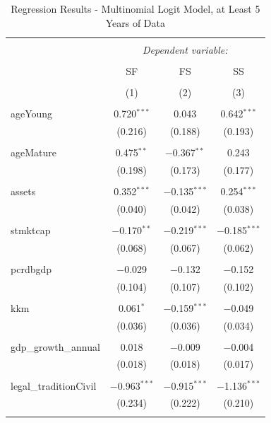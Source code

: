\documentclass[a4paper, nobind]{templates/ociamthesis}
\begin{document}
\begin{table}[!htbp] \centering 
  \caption{Regression Results - Multinomial Logit Model, at Least 5 Years of Data} 
  \label{} 
\footnotesize 
\begin{tabular}{@{\extracolsep{5pt}}lccc} 
\\[-1.8ex]\hline 
\hline \\[-1.8ex] 
 & \multicolumn{3}{c}{\textit{Dependent variable:}} \\ 
\cline{2-4} 
\\[-1.8ex] & SF & FS & SS \\ 
\\[-1.8ex] & (1) & (2) & (3)\\ 
\hline \\[-1.8ex] 
 ageYoung & 0.720$^{***}$ & 0.043 & 0.642$^{***}$ \\ 
  & (0.216) & (0.188) & (0.193) \\ 
  & & & \\ 
 ageMature & 0.475$^{**}$ & $-$0.367$^{**}$ & 0.243 \\ 
  & (0.198) & (0.173) & (0.177) \\ 
  & & & \\ 
 assets & 0.352$^{***}$ & $-$0.135$^{***}$ & 0.254$^{***}$ \\ 
  & (0.040) & (0.042) & (0.038) \\ 
  & & & \\ 
 stmktcap & $-$0.170$^{**}$ & $-$0.219$^{***}$ & $-$0.185$^{***}$ \\ 
  & (0.068) & (0.067) & (0.062) \\ 
  & & & \\ 
 pcrdbgdp & $-$0.029 & $-$0.132 & $-$0.152 \\ 
  & (0.104) & (0.107) & (0.102) \\ 
  & & & \\ 
 kkm & 0.061$^{*}$ & $-$0.159$^{***}$ & $-$0.049 \\ 
  & (0.036) & (0.036) & (0.034) \\ 
  & & & \\ 
 gdp\_growth\_annual & 0.018 & $-$0.009 & $-$0.004 \\ 
  & (0.018) & (0.018) & (0.017) \\ 
  & & & \\ 
 legal\_traditionCivil & $-$0.963$^{***}$ & $-$0.915$^{***}$ & $-$1.136$^{***}$ \\ 
  & (0.234) & (0.222) & (0.210) \\ 
  & & & \\ 

\end{tabular}
\end{table}
\end{document}
